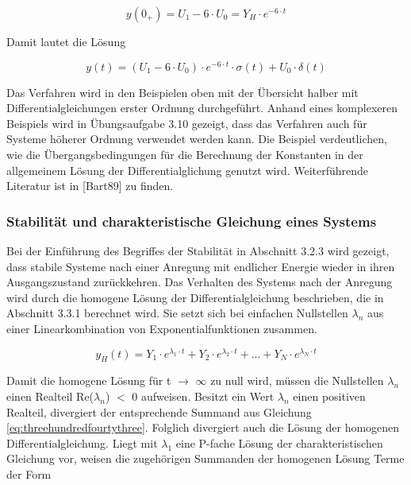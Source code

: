 \begin{equation}\label{eq:threehundredfourtyone}
y\left(0_{+} \right)=U_{1} -6\cdot U_{0} =Y_{H} \cdot e^{-6\cdot t} 
\end{equation}

\noindent Damit lautet die L\"{o}sung

\begin{equation}\label{eq:threehundredfourtytwo}
y\left(t\right)=\left(U_{1} -6\cdot U_{0} \right)\cdot e^{-6\cdot t} \cdot \sigma \left(t\right)+U_{0} \cdot \delta \left(t\right)
\end{equation}\bigskip

\noindent Das Verfahren wird in den Beispielen oben mit der \"{U}bersicht halber mit Differentialgleichungen erster Ordnung durchgef\"{u}hrt. Anhand eines komplexeren Beispiels wird in \"{U}bungsaufgabe 3.10 gezeigt, dass das Verfahren auch f\"{u}r Systeme h\"{o}herer Ordnung verwendet werden kann. \newline
Die Beispiel verdeutlichen, wie die \"{U}bergangsbedingungen f\"{u}r die Berechnung der Konstanten in der allgemeinem L\"{o}sung der Differentialglichung genutzt wird. Weiterf\"{u}hrende Literatur ist in [Bart89] zu finden.

\subsubsection{Stabilität und charakteristische Gleichung eines Systems}

Bei der Einf\"{u}hrung des Begriffes der Stabilit\"{a}t in Abschnitt 3.2.3 wird gezeigt, dass stabile Systeme nach einer Anregung mit endlicher Energie wieder in ihren Ausgangszustand zur\"{u}ckkehren. Das Verhalten des Systems nach der Anregung wird durch die homogene L\"{o}sung der Differentialgleichung beschrieben, die in Abschnitt 3.3.1 berechnet wird. Sie setzt sich bei einfachen Nullstellen $\lambda_{n}$ aus einer Linearkombination von Exponentialfunktionen zusammen. 

\begin{equation}\label{eq:threehundredfourtythree}
y_{H} \left(t\right)=Y_{1} \cdot e^{\lambda _{1} \cdot t} +Y_{2} \cdot e^{\lambda _{2} \cdot t} +...+Y_{N} \cdot e^{\lambda _{N} \cdot t} 
\end{equation}

\noindent Damit die homogene L\"{o}sung f\"{u}r t $\rightarrow$ $\infty$ zu null wird, m\"{u}ssen die Nullstellen $\lambda_{n}$ einen Realteil Re($\lambda_{n}$) $\mathrm{<}$ 0 aufweisen. Besitzt ein Wert $\lambda_{n}$ einen positiven Realteil, divergiert der entsprechende Summand aus Gleichung \eqref{eq:threehundredfourtythree}. Folglich divergiert auch die L\"{o}sung der homogenen Differentialgleichung. \newline
Liegt mit $\lambda_{1}$ eine P-fache L\"{o}sung der charakteristischen Gleichung vor, weisen die zugeh\"{o}rigen Summanden der homogenen L\"{o}sung Terme der Form

